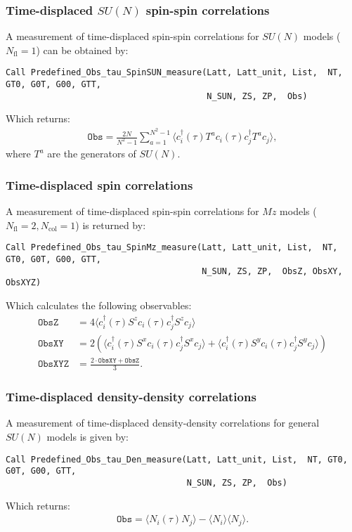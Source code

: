 \subsubsection{Time-displaced $SU(N)$ spin-spin correlations}

A measurement of time-displaced spin-spin correlations for $SU(N)$ models ($N_\text{fl} = 1$) can be obtained by:
\begin{lstlisting}[style=fortran]
Call Predefined_Obs_tau_SpinSUN_measure(Latt, Latt_unit, List,  NT, GT0, G0T, G00, GTT, 
                                        N_SUN, ZS, ZP,  Obs)
\end{lstlisting}
Which returns:
\begin{align}
\texttt{Obs} = \frac{2N}{N^2-1}\sum_{a=1}^{N^2 - 1}  \langle c^{\dagger}_i(\tau) T^a c_i(\tau)  c^{\dagger}_j T^a  c_j\rangle,
\end{align}
where $T^a$ are the generators of $SU(N)$.


\subsubsection{Time-displaced spin correlations}

A measurement of time-displaced spin-spin correlations for $M\!z$ models ($N_\text{fl} = 2, N_\text{col} = 1$)  is returned by:
\begin{lstlisting}[style=fortran]
Call Predefined_Obs_tau_SpinMz_measure(Latt, Latt_unit, List,  NT, GT0, G0T, G00, GTT,
                                       N_SUN, ZS, ZP,  ObsZ, ObsXY, ObsXYZ)
\end{lstlisting}
Which calculates the following observables:
\begin{align}
\texttt{ObsZ}   &= 4\langle c^{\dagger}_i(\tau) S^z c_i(\tau)  c^{\dagger}_j S^z  c_j\rangle\\
\texttt{ObsXY}  &= 2 \left(\langle c^{\dagger}_i(\tau) S^x c_i(\tau) c^{\dagger}_j S^x c_j\rangle  +  \langle c^{\dagger}_i(\tau) S^y c_i(\tau)  c^{\dagger}_j S^y c_j\rangle \right)\\
\texttt{ObsXYZ} &= \frac{2\cdot\texttt{ObsXY} + \texttt{ObsZ}}{3}.
\end{align}


\subsubsection{Time-displaced density-density correlations}

A measurement of time-displaced density-density correlations for general $SU(N)$ models is given by:
\begin{lstlisting}[style=fortran]
Call Predefined_Obs_tau_Den_measure(Latt, Latt_unit, List,  NT, GT0, G0T, G00, GTT,
                                    N_SUN, ZS, ZP,  Obs)
\end{lstlisting}
Which returns:
\begin{align}
\texttt{Obs} = \langle N_i(\tau) N_j\rangle - \langle N_i\rangle  \langle N_j\rangle.
\end{align}
